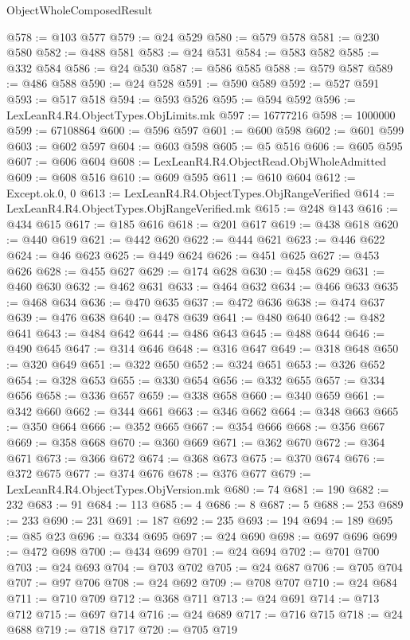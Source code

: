 \begin{lexlean}{ObjectWholeComposedResult}
\begin{coremodule}
@578 := @103 @577
@579 := @24 @529
@580 := @579 @578
@581 := @230 @580
@582 := @488 @581
@583 := @24 @531
@584 := @583 @582
@585 := @332 @584
@586 := @24 @530
@587 := @586 @585
@588 := @579 @587
@589 := @486 @588
@590 := @24 @528
@591 := @590 @589
@592 := @527 @591
@593 := @517 @518
@594 := @593 @526
@595 := @594 @592
@596 := LexLeanR4.R4.ObjectTypes.ObjLimits.mk
@597 := 16777216
@598 := 1000000
@599 := 67108864
@600 := @596 @597
@601 := @600 @598
@602 := @601 @599
@603 := @602 @597
@604 := @603 @598
@605 := @5 @516
@606 := @605 @595
@607 := @606 @604
@608 := LexLeanR4.R4.ObjectRead.ObjWholeAdmitted
@609 := @608 @516
@610 := @609 @595
@611 := @610 @604
@612 := Except.ok.{0, 0}
@613 := LexLeanR4.R4.ObjectTypes.ObjRangeVerified
@614 := LexLeanR4.R4.ObjectTypes.ObjRangeVerified.mk
@615 := @248 @143
@616 := @434 @615
@617 := @185 @616
@618 := @201 @617
@619 := @438 @618
@620 := @440 @619
@621 := @442 @620
@622 := @444 @621
@623 := @446 @622
@624 := @46 @623
@625 := @449 @624
@626 := @451 @625
@627 := @453 @626
@628 := @455 @627
@629 := @174 @628
@630 := @458 @629
@631 := @460 @630
@632 := @462 @631
@633 := @464 @632
@634 := @466 @633
@635 := @468 @634
@636 := @470 @635
@637 := @472 @636
@638 := @474 @637
@639 := @476 @638
@640 := @478 @639
@641 := @480 @640
@642 := @482 @641
@643 := @484 @642
@644 := @486 @643
@645 := @488 @644
@646 := @490 @645
@647 := @314 @646
@648 := @316 @647
@649 := @318 @648
@650 := @320 @649
@651 := @322 @650
@652 := @324 @651
@653 := @326 @652
@654 := @328 @653
@655 := @330 @654
@656 := @332 @655
@657 := @334 @656
@658 := @336 @657
@659 := @338 @658
@660 := @340 @659
@661 := @342 @660
@662 := @344 @661
@663 := @346 @662
@664 := @348 @663
@665 := @350 @664
@666 := @352 @665
@667 := @354 @666
@668 := @356 @667
@669 := @358 @668
@670 := @360 @669
@671 := @362 @670
@672 := @364 @671
@673 := @366 @672
@674 := @368 @673
@675 := @370 @674
@676 := @372 @675
@677 := @374 @676
@678 := @376 @677
@679 := LexLeanR4.R4.ObjectTypes.ObjVersion.mk
@680 := 74
@681 := 190
@682 := 232
@683 := 91
@684 := 113
@685 := 4
@686 := 8
@687 := 5
@688 := 253
@689 := 233
@690 := 231
@691 := 187
@692 := 235
@693 := 194
@694 := 189
@695 := @85 @23
@696 := @334 @695
@697 := @24 @690
@698 := @697 @696
@699 := @472 @698
@700 := @434 @699
@701 := @24 @694
@702 := @701 @700
@703 := @24 @693
@704 := @703 @702
@705 := @24 @687
@706 := @705 @704
@707 := @97 @706
@708 := @24 @692
@709 := @708 @707
@710 := @24 @684
@711 := @710 @709
@712 := @368 @711
@713 := @24 @691
@714 := @713 @712
@715 := @697 @714
@716 := @24 @689
@717 := @716 @715
@718 := @24 @688
@719 := @718 @717
@720 := @705 @719

\end{coremodule}
\end{lexlean}
